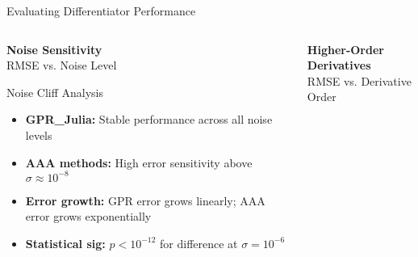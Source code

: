 \documentclass[aspectratio=169]{beamer}
\begin{document}
\begin{frame}{Evaluating Differentiator Performance}
  
  \begin{columns}[t]
    
    \begin{column}{0.48\textwidth}
      \centering
      \textbf{\textcolor{errorred}{Noise Sensitivity}}\\
      \small{RMSE vs. Noise Level}
      
      \vspace{0.5em}
      
      \vspace{0.5em}
      \begin{block}{\small Noise Cliff Analysis}
        \tiny
        \begin{itemize}
          \item \textbf{GPR\_Julia:} Stable performance across all noise levels
          \item \textbf{AAA methods:} High error sensitivity above $\sigma \approx 10^{-8}$
          \item \textbf{Error growth:} GPR error grows linearly; AAA error grows exponentially
          \item \textbf{Statistical sig:} $p < 10^{-12}$ for difference at $\sigma = 10^{-6}$
        \end{itemize}
      \end{block}
    \end{column}
    
    \begin{column}{0.48\textwidth}
      \centering
      \textbf{\textcolor{warningorange}{Higher-Order Derivatives}}\\
      \small{RMSE vs. Derivative Order}
      

\end{column}
\end{columns}
\end{frame}
\end{document}
